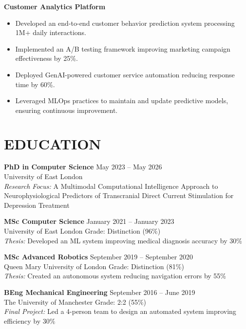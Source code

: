 \documentclass[10pt,a4paper]{article}
\begin{document}
\textbf{Customer Analytics Platform}
\begin{itemize}
    \item Developed an end-to-end customer behavior prediction system processing 1M+ daily interactions.
    \item Implemented an A/B testing framework improving marketing campaign effectiveness by 25\%.
    \item Deployed GenAI-powered customer service automation reducing response time by 60\%.
    \item Leveraged MLOps practices to maintain and update predictive models, ensuring continuous improvement.
\end{itemize}

\section*{EDUCATION}

\textbf{PhD in Computer Science} \hfill May 2023 -- May 2026\\
University of East London\\
\textit{Research Focus:} A Multimodal Computational Intelligence Approach to Neurophysiological Predictors of Transcranial Direct Current Stimulation for Depression Treatment

\textbf{MSc Computer Science} \hfill January 2021 -- January 2023\\
University of East London \hfill Grade: Distinction (96\%)\\
\textit{Thesis:} Developed an ML system improving medical diagnosis accuracy by 30\%

\textbf{MSc Advanced Robotics} \hfill September 2019 -- September 2020\\
Queen Mary University of London \hfill Grade: Distinction (81\%)\\
\textit{Thesis:} Created an autonomous system reducing navigation errors by 55\%

\textbf{BEng Mechanical Engineering} \hfill September 2016 -- June 2019\\
The University of Manchester \hfill Grade: 2:2 (55\%)\\
\textit{Final Project:} Led a 4-person team to design an automated system improving efficiency by 30\%
\end{document}
